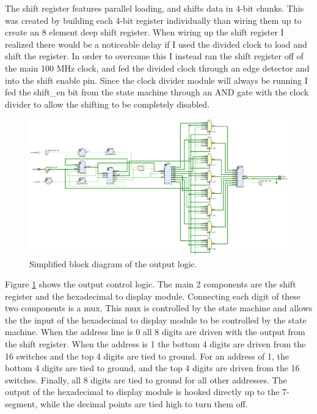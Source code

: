 \documentclass[11pt]{article}
\begin{document}
The shift register features parallel loading, and shifts data in 4-bit chunks. This was created by building each 4-bit register individually than wiring them up to create an 8 element deep shift register. When wiring up the shift register I realized there would be a noticeable delay if I used the divided clock to load and shift the register. In order to overcome this I instead ran the shift register off of the main 100 MHz clock, and fed the divided clock through an edge detector and into the shift enable pin. Since the clock divider module will always be running I fed the shift\_en bit from the state machine through an AND gate with the clock divider to allow the shifting to be completely disabled.

\begin{figure}[H]
\includegraphics[trim={11cm 0cm 0cm 0cm}, clip, width=7 in]{./figures/schematic.eps}
	\centering
	\caption{Simplified block diagram of the output logic.}
	\label{fig:output_logic}
\end{figure}

Figure \ref{fig:output_logic} shows the output control logic. The main 2 components are the shift register and the hexadecimal to display module. Connecting each digit of these two components is a mux. This mux is controlled by the state machine and allows the the input of the hexadecimal to display module to be controlled by the state machine. When the address line is 0 all 8 digits are driven with the output from the shift register. When the address is 1 the bottom 4 digits are driven from the 16 switches and the top 4 digits are tied to ground. For an address of 1, the bottom 4 digits are tied to ground, and the top 4 digits are driven from the 16 switches. Finally, all 8 digits are tied to ground for all other addresses. The output of the hexadecimal to display module is hooked directly up to the 7-segment, while the decimal points are tied high to turn them off.
\end{document}
